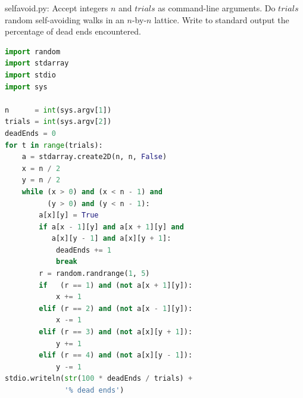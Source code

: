 \documentclass[8pt,a4paper,compress]{beamer}
\begin{document}
\begin{frame}[fragile]
\pause

\begin{framed}
\tiny selfavoid.py: Accept integers $n$ and $trials$ as command-line arguments. Do $trials$ random self-avoiding walks in an $n$-by-$n$ lattice. Write to standard output the percentage of dead ends encountered.
\end{framed}

\begin{minipage}{190pt}
\begin{lstlisting}[language=Python]
import random
import stdarray
import stdio
import sys

n      = int(sys.argv[1])
trials = int(sys.argv[2])
deadEnds = 0
for t in range(trials):
    a = stdarray.create2D(n, n, False)
    x = n / 2
    y = n / 2
    while (x > 0) and (x < n - 1) and 
          (y > 0) and (y < n - 1):
        a[x][y] = True
        if a[x - 1][y] and a[x + 1][y] and 
           a[x][y - 1] and a[x][y + 1]:
            deadEnds += 1
            break
        r = random.randrange(1, 5)
        if   (r == 1) and (not a[x + 1][y]):
            x += 1
        elif (r == 2) and (not a[x - 1][y]):
            x -= 1
        elif (r == 3) and (not a[x][y + 1]):
            y += 1
        elif (r == 4) and (not a[x][y - 1]):
            y -= 1
stdio.writeln(str(100 * deadEnds / trials) + 
              '% dead ends')
\end{lstlisting}
\end{minipage}%
\begin{minipage}{110pt}
\hfill {}

\end{minipage}
\end{frame}
\end{document}
